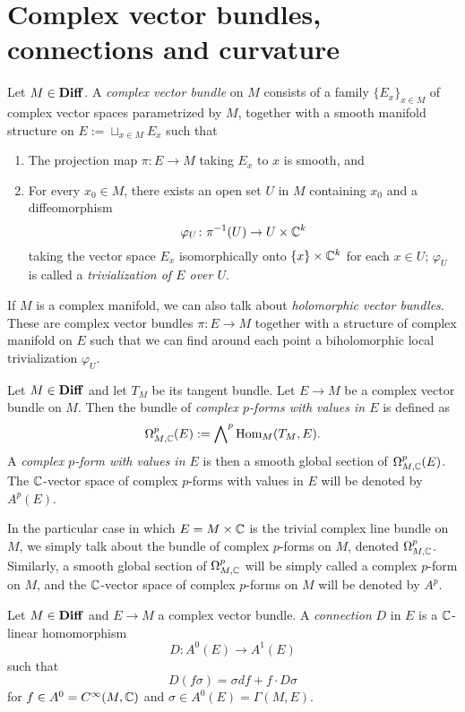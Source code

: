 \section{Complex vector bundles, connections and curvature}

\begin{defn}
    Let $M\in \mathbf{Diff}$. 
    A \textit{complex vector bundle} on $M$ consists of a family $\{E_{x}\}_{x\in M}$ of complex vector spaces parametrized by $M$, together with a smooth manifold structure on $E:=\sqcup_{x\in M}E_{x}$ such that
    \begin{enumerate}[label=\roman*)]
	\item The projection map $\pi\colon E\to M$ taking $E_{x}$ to $x$ is smooth, and
	\item For every $x_{0}\in M$, there exists an open set $U$ in $M$ containing $x_{0}$ and a diffeomorphism
	    \[ \varphi_{U}\colon \pi^{-1}(U)\to U\times \mathbb{C}^{k} \]
	    taking the vector space $E_{x}$ isomorphically onto $\{x\}\times \mathbb{C}^{k}$ for each $x\in U$;
	    $\varphi_{U}$ is called a \textit{trivialization of $E$ over $U$}.
    \end{enumerate}
\end{defn}

\begin{rem}
    If $M$ is a complex manifold, we can also talk about \textit{holomorphic vector bundles}.
    These are complex vector bundles $\pi\colon E\to M$ together with a structure of complex manifold on $E$ such that we can find around each point a biholomorphic local trivialization $\varphi_{U}$.
\end{rem}

\begin{defn}
    Let $M\in \mathbf{Diff}$ and let $T_{M}$ be its tangent bundle.
    Let $E\to M$ be a complex vector bundle on $M$.
    Then the bundle of \textit{complex $p$-forms with values in $E$} is defined as
    \[ \Omega_{M,\mathbb{C}}^{p}(E):=\bigwedge\nolimits^{p}\operatorname{Hom}_{M}(T_{M},E). \]
    A \textit{complex $p$-form with values in $E$} is then a smooth global section of $\Omega_{M,\mathbb{C}}^{p}(E)$.
    The $\mathbb{C}$-vector space of complex $p$-forms with values in $E$ will be denoted by $A^{p}(E)$.
\end{defn}

\begin{rem}
    In the particular case in which $E=M\times \mathbb{C}$ is the trivial complex line bundle on $M$, we simply talk about the bundle of complex $p$-forms on $M$, denoted $\Omega_{M,\mathbb{C}}^{p}$.
    Similarly, a smooth global section of $\Omega_{M,\mathbb{C}}^{p}$ will be simply called a complex $p$-form on $M$, and the $\mathbb{C}$-vector space of complex $p$-forms on $M$ will be denoted by $A^{p}$.
\end{rem}

\begin{defn}[Connection]
    Let $M\in \mathbf{Diff}$ and $E\to M$ a complex vector bundle.
    A \textit{connection} $D$ in $E$ is a $\mathbb{C}$-linear homomorphism
    \[ D\colon A^{0}(E)\to A^{1}(E) \]
    such that
    \[ D(f\sigma)=\sigma df +f\cdot D\sigma \]
    for $f\in A^{0}=C^{\infty}(M,\mathbb{C})$ and $\sigma\in A^{0}(E)=\Gamma(M,E)$.
\end{defn}
